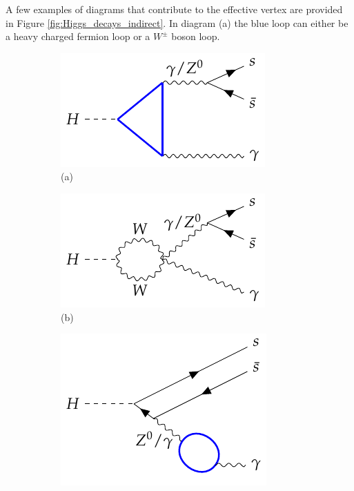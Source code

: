A few examples of diagrams that contribute to the effective vertex are provided in Figure \ref{fig:Higgs_decays_indirect}. In diagram (a) the blue loop can either be a heavy charged fermion loop or a $W^{\pm}$ boson loop.

\begin{figure}[!ht]
    \captionsetup[subfigure]{labelformat=empty}
    \vspace*{-0.2cm}
    \centering
    \setlength{\mylength}{\textwidth}
    \begin{subfigure}[t]{0.333\mylength}
            \centering
            \includegraphics[width=0.323\mylength]{resources/H_rare_indirect/v1.pdf}%
            \caption{\footnotesize (a)}
    \end{subfigure}%
    \begin{subfigure}[t]{0.333\mylength}
            \centering
            \includegraphics[width=0.323\mylength]{resources/H_rare_indirect/v2.pdf}%
            \caption{\footnotesize (b)}
    \end{subfigure}%
    \begin{subfigure}[t]{0.333\mylength}
            \centering
            \includegraphics[width=0.323\mylength]{resources/H_rare_indirect/v4.pdf}%

\end{subfigure}
\end{figure}
